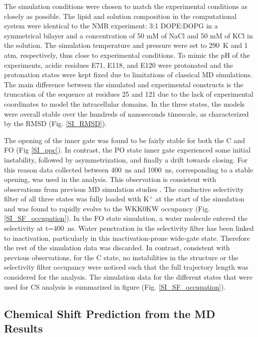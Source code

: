 \documentclass[%
 aip,
 amsmath,amssymb,
 preprint,%
]{revtex4-1}
\begin{document}
The simulation conditions were chosen to match the experimental conditions as closely as possible. The lipid and solution composition in the computational system were identical to the NMR experiment: 3:1 DOPE:DOPG in a symmetrical bilayer and a concentration of 50 mM of NaCl and 50 mM of KCl in the solution. The simulation temperature and pressure were set to \SI{290}{\kelvin} and 1 atm, respectively, thus close to experimental conditions. To mimic the pH of the experiments, acidic residues E71, E118, and E120 were protonated and the protonation states were kept fixed due to limitations of classical MD simulations. The main difference between the simulated and experimental constructs is the truncation of the sequence at residues 25 and 121 due to the lack of experimental coordinates to model the intracellular domains. In the three states, the models were overall stable over the hundreds of nanoseconds timescale, as characterized by the RMSD (Fig. \ref{SI_RMSD}).

The opening of the inner gate was found to be fairly stable for both the C and FO (Fig \ref{SI_ppc}). In contrast, the PO state inner gate experienced some initial instability, followed by asymmetrization, and finally a drift towards closing. For this reason data collected between \SI{400}{\nano\second} and \SI{1000}{\nano\second}, corresponding to a stable opening, was used in the analysis. This observation is consistent with observations from previous MD simulation studies \cite{Li2018}. The conductive selectivity filter of all three states was fully loaded with K$^+$ at the start of the simulation and was found to rapidly evolve to the WKK0KW occupancy (Fig. \ref{SI_SF_occupation}). In the FO state simulation, a water molecule entered the selectivity at t=\SI{400}{\nano\second}. Water penetration in the selectivity filter has been linked to inactivation, particularly in this inactivation-prone wide-gate state\cite{Furini2020}. Therefore the rest of the simulation data was discarded. In contrast, consistent with previous observations\cite{Li2018}, for the C state, no instabilities in the structure or the selectivity filter occupancy were noticed such that the full trajectory length was considered for the analysis. The simulation data for the different states that were used for CS analysis is summarized in figure (Fig. \ref{SI_SF_occupation}).

\subsection{Chemical Shift Prediction from the MD Results}
\end{document}
